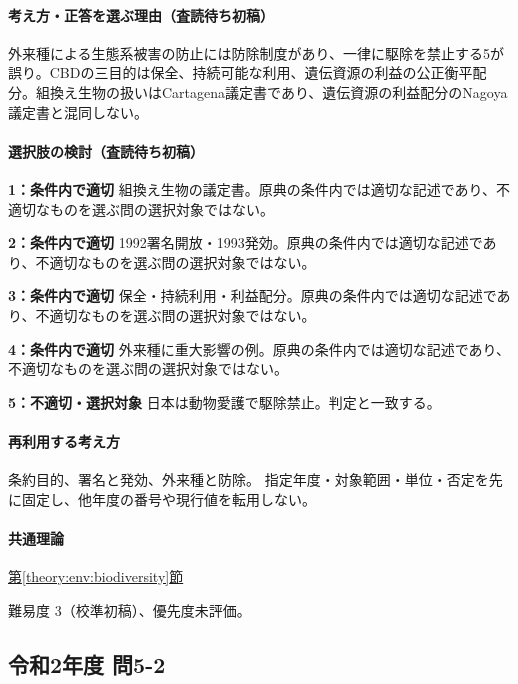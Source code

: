 \paragraph{考え方・正答を選ぶ理由（査読待ち初稿）} 外来種による生態系被害の防止には防除制度があり、一律に駆除を禁止する5が誤り。CBDの三目的は保全、持続可能な利用、遺伝資源の利益の公正衡平配分。組換え生物の扱いはCartagena議定書であり、遺伝資源の利益配分のNagoya議定書と混同しない。

\paragraph{選択肢の検討（査読待ち初稿）}\mbox{}\par

\noindent\textbf{1：条件内で適切} 組換え生物の議定書。原典の条件内では適切な記述であり、不適切なものを選ぶ問の選択対象ではない。\par

\noindent\textbf{2：条件内で適切} 1992署名開放・1993発効。原典の条件内では適切な記述であり、不適切なものを選ぶ問の選択対象ではない。\par

\noindent\textbf{3：条件内で適切} 保全・持続利用・利益配分。原典の条件内では適切な記述であり、不適切なものを選ぶ問の選択対象ではない。\par

\noindent\textbf{4：条件内で適切} 外来種に重大影響の例。原典の条件内では適切な記述であり、不適切なものを選ぶ問の選択対象ではない。\par

\noindent\textbf{5：不適切・選択対象} 日本は動物愛護で駆除禁止。判定と一致する。\par

\paragraph{再利用する考え方} 条約目的、署名と発効、外来種と防除。 指定年度・対象範囲・単位・否定を先に固定し、他年度の番号や現行値を転用しない。

\paragraph{共通理論} \hyperref[theory:env:biodiversity]{第\ref*{theory:env:biodiversity}節}

\par 難易度 3（校準初稿）、優先度未評価。

\subsection{令和2年度 問5-2}
\label{q:r02-reg-basic-5-2}

